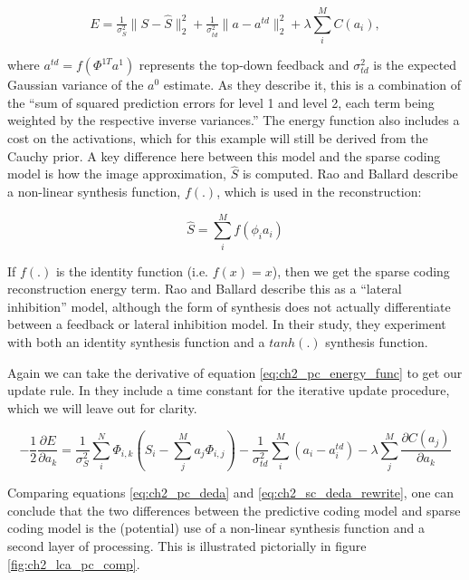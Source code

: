 \begin{equation}\label{eq:ch2_pc_energy_func}
        E =
        \tfrac{1}{\sigma_{S}^{2}} \|S - \hat{S} \|_{2}^{2} +
        \tfrac{1}{\sigma_{td}^{2}} \|a - a^{td}\|_{2}^{2} +
        \lambda \sum\limits_{i}^{M}C(a_{i}),
\end{equation}

where $a^{td} = f\left(\Phi^{1T}a^{1}\right)$ represents the top-down feedback and $\sigma_{td}^2$ is the expected Gaussian variance of the $a^{0}$ estimate. As they describe it, this is a combination of the ``sum of squared prediction errors for level 1 and level 2, each term being weighted by the respective inverse variances.'' The energy function also includes a cost on the activations, which for this example will still be derived from the Cauchy prior. A key difference here between this model and the sparse coding model is how the image approximation, $\hat{S}$ is computed. Rao and Ballard describe a non-linear synthesis function, $f(.)$, which is used in the reconstruction:

\begin{equation}\label{eq:ch2_pc_synthesis}
 \hat{S} = \sum\limits_{i}^{M}f(\phi_{i}a_{i})
\end{equation}

If $f(.)$ is the identity function (i.e. $f(x)=x$), then we get the sparse coding reconstruction energy term. Rao and Ballard describe this as a ``lateral inhibition'' model, although the form of synthesis does not actually differentiate between a feedback or lateral inhibition model. In their study, they experiment with both an identity synthesis function and a $tanh(.)$ synthesis function.

Again we can take the derivative of equation \eqref{eq:ch2_pc_energy_func} to get our update rule. In \parencite{rao1999predictive} they include a time constant for the iterative update procedure, which we will leave out for clarity.

\begin{equation}\label{eq:ch2_pc_deda}
    - \frac{1}{2}\frac{\partial E}{\partial a_{k}}
    =
        \frac{1}{\sigma_{S}^{2}}\sum\limits_{i}^{N} \Phi_{i,k} \left(S_{i} - \sum\limits_{j}^{M}a_{j} \Phi_{i,j}\right) -
        \frac{1}{\sigma_{td}^{2}}\sum\limits_{i}^{M}(a_{i}-a_{i}^{td}) -
        \lambda \sum\limits_{j}^{M}\frac{\partial C(a_{j})}{\partial a_{k}}
\end{equation}

Comparing equations \eqref{eq:ch2_pc_deda} and \eqref{eq:ch2_sc_deda_rewrite}, one can conclude that the two differences between the predictive coding model and sparse coding model is the (potential) use of a non-linear synthesis function and a second layer of processing. This is illustrated pictorially in figure \ref{fig:ch2_lca_pc_comp}.

